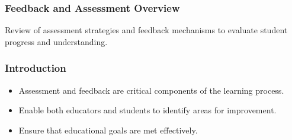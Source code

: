 \documentclass[aspectratio=169]{beamer}
\begin{document}
\begin{frame}[fragile]
    \frametitle{Feedback and Assessment Overview}
    Review of assessment strategies and feedback mechanisms to evaluate student progress and understanding.
\end{frame}

\begin{frame}[fragile]
    \frametitle{Introduction}
    \begin{itemize}
        \item Assessment and feedback are critical components of the learning process.
        \item Enable both educators and students to identify areas for improvement.
        \item Ensure that educational goals are met effectively.
    \end{itemize}
\end{frame}
\end{document}
